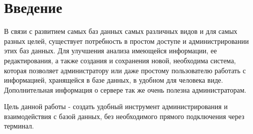 \section{Введение}
В связи с развитием самых баз данных самых различных видов и для самых разных целей, существует потребность в простом доступе и администрировании этих баз данных. Для улучшения анализа имеющейся информации, ее редактирования, а также создания и сохранения новой, необходима система, которая позволяет администратору или даже простому пользователю работать с информацией, хранящейся в базе данных, в удобном для человека виде. Дополнительная информация о сервере так же очень полезна администраторам.
\par
Цель данной работы - создать удобный инструмент  администрирования и взаимодействия с базой данных, без необходимого прямого подключения через терминал.
\newpage
